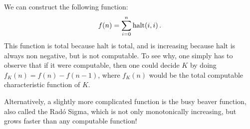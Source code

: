 \begin{solution}
We can construct the following function:
\[
f(n) = \sum_{i = 0}^n \mathrm{halt}(i, i)\,.
\]
This function is total because \(\mathrm{halt}\) is total,
and is increasing because \(\mathrm{halt}\) is always non negative,
but is not computable.
To see why, one simply has to observe that if it were computable,
then one could decide \(K\) by doing \(f_K(n) = f(n) - f(n-1)\),
where \(f_K(n)\) would be the total computable characteristic function of \(K\).

Alternatively, a slightly more complicated function
is the busy beaver function,
also called the Radó Sigma,
which is not only monotonically increasing,
but grows faster than any computable function!
\end{solution}
